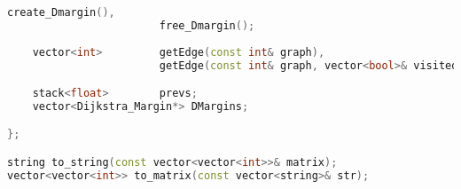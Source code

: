\begin{lstlisting}[language=C++]
                        create_Dmargin(),
                        free_Dmargin();
                        
    vector<int>         getEdge(const int& graph),
                        getEdge(const int& graph, vector<bool>& visited);

    stack<float>        prevs;
    vector<Dijkstra_Margin*> DMargins;

};

string to_string(const vector<vector<int>>& matrix);
vector<vector<int>> to_matrix(const vector<string>& str);






\end{lstlisting}
